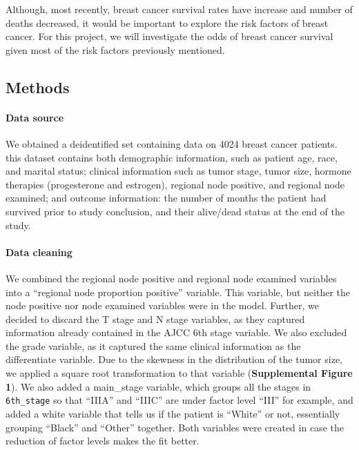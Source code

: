 \documentclass[
]{article}
\begin{document}
Although, most recently, breast cancer survival rates have increase and
number of deaths decreased, it would be important to explore the risk
factors of breast cancer. For this project, we will investigate the odds
of breast cancer survival given most of the risk factors previously
mentioned.

\hypertarget{methods}{%
\subsection{Methods}\label{methods}}

\hypertarget{data-source}{%
\paragraph{Data source}\label{data-source}}

We obtained a deidentified set containing data on 4024 breast cancer
patients. this dataset contains both demographic information, such as
patient age, race, and marital status; clinical information such as
tumor stage, tumor size, hormone therapies (progesterone and estrogen),
regional node positive, and regional node examined; and outcome
information: the number of months the patient had survived prior to
study conclusion, and their alive/dead status at the end of the study.

\hypertarget{data-cleaning}{%
\paragraph{Data cleaning}\label{data-cleaning}}

We combined the regional node positive and regional node examined
variables into a ``regional node proportion positive'' variable. This
variable, but neither the node positive nor node examined variables were
in the model. Further, we decided to discard the T stage and N stage
variables, as they captured information already contained in the AJCC
6th stage variable. We also excluded the grade variable, as it captured
the same clinical information as the differentiate variable. Due to the
skewness in the distribution of the tumor size, we applied a square root
transformation to that variable (\textbf{Supplemental Figure 1}). We
also added a main\_stage variable, which groups all the stages in
\texttt{6th\_stage} so that ``IIIA'' and ``IIIC'' are under factor level
``III'' for example, and added a white variable that tells us if the
patient is ``White'' or not, essentially grouping ``Black'' and
``Other'' together. Both variables were created in case the reduction of
factor levels makes the fit better.
\end{document}
